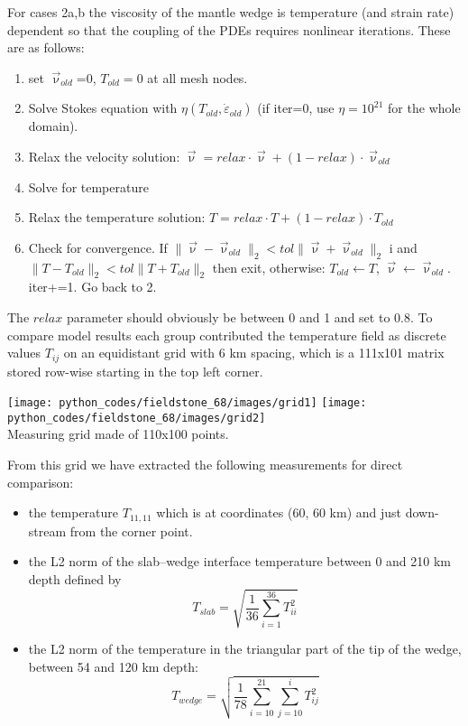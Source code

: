 For cases 2a,b the viscosity of the mantle 
wedge is temperature (and strain rate) dependent so that the coupling of the PDEs 
requires nonlinear iterations. These are as follows:
\begin{enumerate}
\item set $\vec{\upnu}_{old}$=0, $T_{old}=0$ at all mesh nodes.
\item Solve Stokes equation with $\eta(T_{old},\dot{\varepsilon}_{old})$ (if iter=0, use $\eta=10^{21}$ for the whole domain).
\item Relax the velocity solution: $\vec\upnu = relax \cdot \vec{\upnu} + (1-relax)\cdot \vec{\upnu}_{old}$
\item Solve for temperature 
\item Relax the temperature solution: $T=relax \cdot T + (1-relax) \cdot T_{old}$
\item Check for convergence. If $\|\vec\upnu-\vec\upnu_{old}\|_2 < tol \| \vec\upnu + \vec\upnu_{old}  \|_2$ i
and $\|T-T_{old}\|_2 < tol \| T + T_{old}  \|_2$ then exit, 
otherwise: $T_{old} \leftarrow T$, $ \vec\upnu \leftarrow \vec\upnu_{old} $. iter+=1. Go back to 2. 
\end{enumerate}

The $relax$ parameter should obviously be between 0 and 1 and set to 0.8. 
To compare model results each
group contributed the temperature field as discrete values $T_{ij}$ on
an equidistant grid with 6 km spacing, which is a 111x101 matrix
stored row-wise starting in the top left corner. 

\begin{center}
\texttt{[image: python\_codes/fieldstone\_68/images/grid1]}
\texttt{[image: python\_codes/fieldstone\_68/images/grid2]}\\
{\captionfont Measuring grid made of 110x100 points.}
\end{center}

From this grid we have extracted the following measurements for direct comparison:
\begin{itemize}
\item the temperature $T_{11,11}$ which is at coordinates (60, 60 km) and
just down-stream from the corner point.
\item the L2 norm of the slab–wedge interface temperature between
0 and 210 km depth defined by
\[
T_{slab} = \sqrt{\frac{1}{36} \sum_{i=1}^{36} T_{ii}^2  }
\]
\item 
the L2 norm of the temperature in the triangular part of the
tip of the wedge, between 54 and 120 km depth:
\[
T_{wedge} = \sqrt{ \frac{1}{78} \sum_{i=10}^{21} \sum_{j=10}^i T_{ij}^2   }
\]
\end{itemize}

